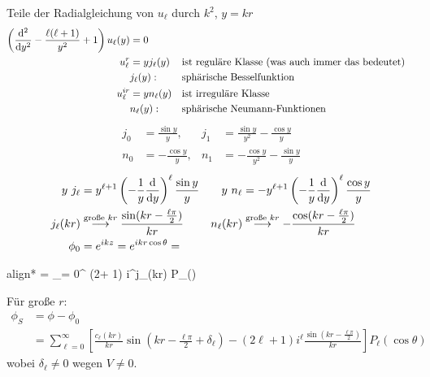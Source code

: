 	Teile der Radialgleichung von $u_\ell$ durch $k^2$, $y=kr$ 
		\begin{align*}
			\left( \frac{\mathrm{d}^2}{\mathrm{d} y^2} - \frac{\ell(\ell+1)}{y^2} + 1
			\right) u_\ell (y) &= 0 \\
			u_\ell^r &= y j_\ell (y) & & \text{ist reguläre Klasse (was auch immer das bedeutet)} \\
			&j_\ell (y) : & &\text{sphärische Besselfunktion} \\
			u_\ell^{ir} &= y n_\ell(y) & &\text{ist irreguläre Klasse}\\
			&n_\ell(y) : & &\text{sphärische Neumann-Funktionen}
		\end{align*}
		\begin{align*}
			j_0 &= \frac{\sin y}{y} ,& j_1 &= \frac{\sin y}{y^2}- \frac{\cos y}{y} \\
			n_0 &= -\frac{\cos y}{y} ,& n_1 &= -\frac{\cos y}{y^2} - \frac{\sin y}{y}
		\end{align*}
		\begin{align*}
			y ~j_\ell &= y^{\ell + 1} \left(-\frac{1}{y} \frac{\mathrm{d}}{\mathrm{d} y}\right)^\ell 
			\frac{\sin y}{y} &
			y ~n_\ell &= - y^{\ell+1} \left(-\frac{1}{y} \frac{\mathrm{d}}{\mathrm{d} y}\right)^\ell
			\frac{\cos y}{y}\\
			j_\ell(kr) &\overset{\text{große }kr}{\longrightarrow} 
			\frac{\sin(kr-\frac{\ell \pi}{2})}{kr} &
			n_\ell(kr) &\overset{\text{große }kr}{\longrightarrow} 
			- \frac{\cos(kr-\frac{\ell \pi}{2})}{kr} \\
			\phi_0 &= e^{ikz} = e^{ikr \cos \theta} =
		\end{align*}
		\begin{empheq}[box=\boxed]{align*}
			= \sum_{\ell = 0}^{\infty} (2\ell + 1) i^\ell j_\ell(kr) P_\ell (\cos \theta)
		\end{empheq}
	Für große $r$:
		\begin{align*}	
			\phi_S &= \phi - \phi_0 \\
			&= \sum_{\ell = 0}^{\infty} 
			\left[ \frac{c_\ell(kr)}{kr} \sin \left(kr-\frac{\ell \pi}{2} + \delta_\ell \right)
				-(2\ell +1)i^\ell \frac{\sin \left(kr-\frac{\ell \pi}{2}\right)}{kr}
			\right] P_\ell (\cos \theta)
		\end{align*}
	wobei $\delta_\ell \neq 0$ wegen $V \neq 0$.
	
